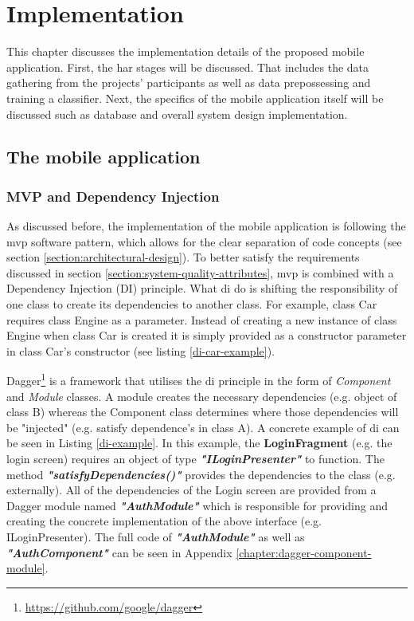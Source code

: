 \chapter{Implementation}
This chapter discusses the implementation details of the proposed mobile application. First, the \gls{har} stages will be discussed. That includes the data gathering from the projects' participants as well as data prepossessing and training a classifier. Next, the specifics of the mobile application itself will be discussed such as database and overall system design implementation.

\section{The mobile application}
       
    \subsection{MVP and Dependency Injection}
    As discussed before, the implementation of the mobile application is following the \gls{mvp} software pattern, which allows for the clear separation of code concepts (see section \ref{section:architectural-design}). To better satisfy the requirements discussed in section \ref{section:system-quality-attributes}, \gls{mvp} is combined with a Dependency Injection (DI) principle. What \gls{di} do is shifting the responsibility of one class to create its dependencies to another class. For example, class Car requires class Engine as a parameter. Instead of creating a new instance of class Engine when class Car is created it is simply provided as a constructor parameter in class Car's constructor (see listing \ref{di-car-example}).
    
    Dagger\footnote{\url{https://github.com/google/dagger}} is a framework that utilises the \gls{di} principle in the form of \textit{Component} and \textit{Module} classes. A module creates the necessary dependencies (e.g. object of class B) whereas the Component class determines where those dependencies will be "injected" (e.g. satisfy dependence's in class A). A concrete example of \gls{di} can be seen in Listing \ref{di-example}. In this example, the \textbf{LoginFragment} (e.g. the login screen) requires an object of type \textit{\textbf{"ILoginPresenter"}} to function. The method \textit{\textbf{"satisfyDependencies()"}} provides the dependencies to the class (e.g. externally). All of the dependencies of the Login screen are provided from a Dagger module named \textit{\textbf{"AuthModule"}} which is responsible for providing and creating the concrete implementation of the above interface (e.g. ILoginPresenter). The full code of \textit{\textbf{"AuthModule"}} as well as \textit{\textbf{"AuthComponent"}} can be seen in Appendix \ref{chapter:dagger-component-module}.   
    
